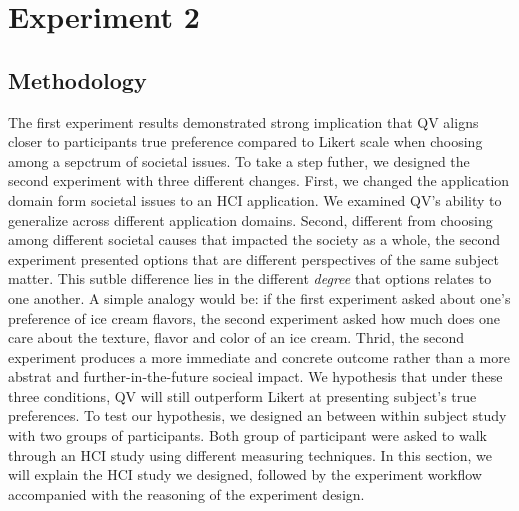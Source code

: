 \section{Experiment 2}
\subsection{Methodology} \label{method-2}


The first experiment results demonstrated strong implication that
QV aligns closer to participants true preference
compared to Likert scale 
when choosing among a sepctrum of societal issues.
To take a step futher, 
we designed the second experiment
with three different changes.
First, we changed the application domain form societal issues to an HCI application.
We examined QV's ability to generalize across different application domains.
Second, different from choosing among different societal causes that impacted the society as a whole,
the second experiment presented options that are different perspectives of the same subject matter.
This sutble difference lies in the different \textit{degree} that options relates to one another.
A simple analogy would be: 
if the first experiment asked about one's preference of ice cream flavors, 
the second experiment asked how much does one care about the texture, flavor and color of an ice cream.
Thrid, the second experiment produces a more immediate and concrete outcome 
rather than a more abstrat and further-in-the-future socieal impact.
We hypothesis that under these three conditions, QV will still outperform Likert 
at presenting subject's true preferences.
To test our hypothesis, we designed an 
between within subject study with two groups of participants.
Both group of participant were asked to walk through an HCI study
using different measuring techniques. 
In this section, we will explain the HCI study we designed, 
followed by the experiment workflow
accompanied with the reasoning of the experiment design.

 
